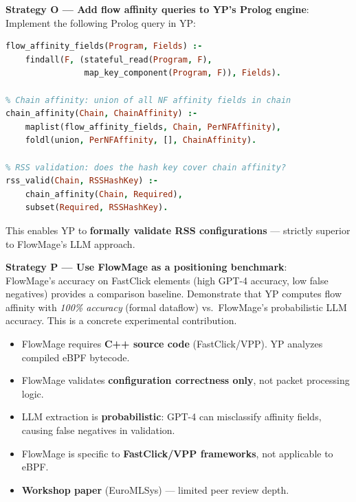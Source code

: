 \begin{strategybox}
\textbf{Strategy O --- Add flow affinity queries to YP's Prolog engine}:\\
Implement the following Prolog query in YP:
\begin{lstlisting}[language=Prolog]
% Flow affinity: fields that define a unique flow for this NF
flow_affinity_fields(Program, Fields) :-
    findall(F, (stateful_read(Program, F), 
                map_key_component(Program, F)), Fields).

% Chain affinity: union of all NF affinity fields in chain  
chain_affinity(Chain, ChainAffinity) :-
    maplist(flow_affinity_fields, Chain, PerNFAffinity),
    foldl(union, PerNFAffinity, [], ChainAffinity).

% RSS validation: does the hash key cover chain affinity?
rss_valid(Chain, RSSHashKey) :-
    chain_affinity(Chain, Required),
    subset(Required, RSSHashKey).
\end{lstlisting}
This enables YP to \textbf{formally validate RSS configurations} --- strictly superior to FlowMage's LLM approach.

\textbf{Strategy P --- Use FlowMage as a positioning benchmark}:\\
FlowMage's accuracy on FastClick elements (high GPT-4 accuracy, low false negatives) provides a comparison baseline. Demonstrate that YP computes flow affinity with \emph{100\% accuracy} (formal dataflow) vs.\ FlowMage's probabilistic LLM accuracy. This is a concrete experimental contribution.
\end{strategybox}

\begin{limitbox}
\begin{itemize}
  \item FlowMage requires \textbf{C++ source code} (FastClick/VPP). YP analyzes compiled eBPF bytecode.
  \item FlowMage validates \textbf{configuration correctness only}, not packet processing logic.
  \item LLM extraction is \textbf{probabilistic}: GPT-4 can misclassify affinity fields, causing false negatives in validation.
  \item FlowMage is specific to \textbf{FastClick/VPP frameworks}, not applicable to eBPF.
  \item \textbf{Workshop paper} (EuroMLSys) --- limited peer review depth.
\end{itemize}
\end{limitbox}

